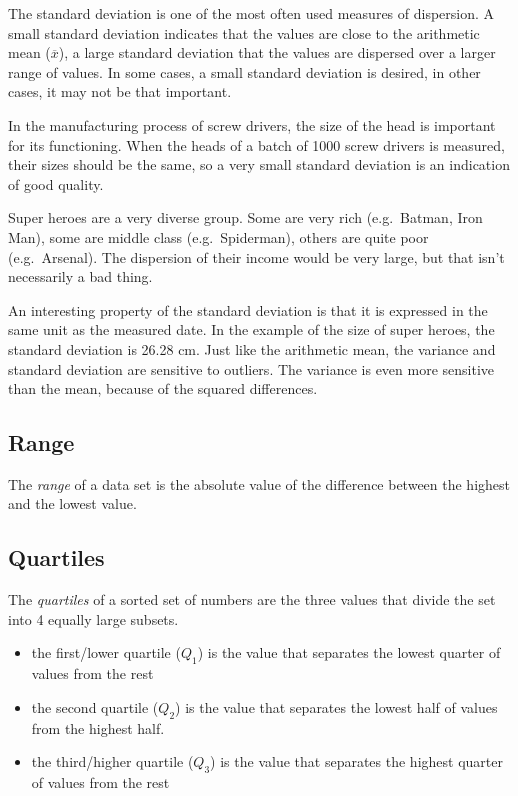 The standard deviation is one of the most often used measures of dispersion. A small standard deviation indicates that the values are close to the arithmetic mean ($\overline{x}$), a large standard deviation that the values are dispersed over a larger range of values. In some cases, a small standard deviation is desired, in other cases, it may not be that important.

\begin{example}
  In the manufacturing process of screw drivers, the size of the head is important for its functioning. When the heads of a batch of 1000 screw drivers is measured, their sizes should be the same, so a very small standard deviation is an indication of good quality.
\end{example}

\begin{example}
  Super heroes are a very diverse group. Some are very rich (e.g.~Batman, Iron Man), some are middle class (e.g.~Spiderman), others are quite poor (e.g.~Arsenal). The dispersion of their income would be very large, but that isn't necessarily a bad thing.
\end{example}

An interesting property of the standard deviation is that it is expressed in the same unit as the measured date. In the example of the size of super heroes, the standard deviation is 26.28 cm. Just like the arithmetic mean, the variance and standard deviation are sensitive to outliers. The variance is even more sensitive than the mean, because of the squared differences.

\subsection{Range}
\label{ssec:range}

\begin{definition}[Range]
  The \emph{range} of a data set is the absolute value of the difference between the highest and the lowest value.
\end{definition}

\subsection{Quartiles}
\label{ssec:quartiles}

\begin{definition}[Quartiles]
  The \emph{quartiles} of a sorted set of numbers are the three values that divide the set into 4 equally large subsets.

  \begin{itemize}
    \item the first/lower quartile ($Q_{1}$) is the value that separates the lowest quarter of values from the rest
    \item the second quartile ($Q_{2}$) is the value that separates the lowest half of values from the highest half.
    \item the third/higher quartile ($Q_{3}$) is the value that separates the highest quarter of values from the rest
  \end{itemize}
\end{definition}

